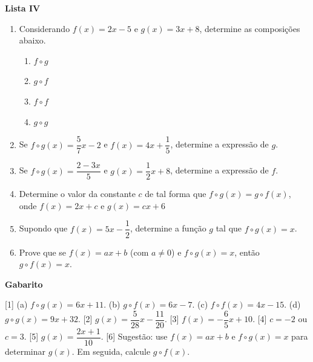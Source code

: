 \documentclass[12pt,a4paper]{article}
\begin{document}
\begin{center}
  \textbf{Lista IV}
\end{center}

\begin{enumerate}
  \item Considerando $f(x) = 2x - 5$ e $g(x) = 3x + 8$, determine as composições
    abaixo.
    \begin{enumerate}
      \item $f\circ g$
      \item $g\circ f$
      \item $f\circ f$
      \item $g\circ g$
    \end{enumerate}

  \item Se $f\circ g(x) = \dfrac{5}{7}x - 2$ e $f(x) = 4x + \dfrac{1}{5}$,
    determine a expressão de $g$.
  
  \item Se $f\circ g(x) = \dfrac{2 - 3x}{5}$ e $g(x) = \dfrac{1}{2}x + 8$,
    determine a expressão de $f$.

  \item Determine o valor da constante $c$ de tal forma que
    $f\circ g(x) = g\circ f(x)$, onde $f(x) = 2x + c$ e 
    $g(x) = cx + 6$

  \item Supondo que $f(x) = 5x - \dfrac{1}{2}$, determine a função 
  $g$ tal que $f\circ g(x) = x$.

  \item Prove que se $f(x) = ax + b$ (com $a\neq 0$) e 
    $f\circ g(x) = x$, então $g\circ f(x) = x$.
      
\end{enumerate}

\begin{center}
  \textbf{Gabarito}
\end{center}

[1] (a) $f\circ g(x) = 6x + 11$. (b) $g\circ f(x) = 6x - 7$. 
(c) $f\circ f(x) = 4x - 15$. (d) $g\circ g(x) = 9x + 32$. 
[2] $g(x) = \dfrac{5}{28}x - \dfrac{11}{20}$. 
[3] $f(x) = -\dfrac{6}{5}x + 10$. 
[4] $c = -2$ ou $c = 3$. 
[5] $g(x) = \dfrac{2x + 1}{10}$.
[6] Sugestão: use $f(x) = ax + b$ e $f\circ g(x) = x$ para determinar $g(x)$.
Em seguida, calcule $g\circ f(x)$. 
\end{document}
